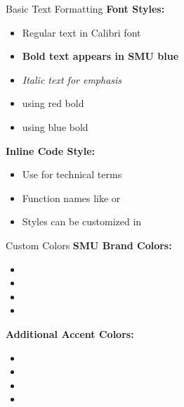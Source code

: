 \documentclass[10pt,aspectratio=1610]{beamer}
\begin{document}
\begin{frame}{Basic Text Formatting}
    \textbf{Font Styles:}
    \begin{itemize}
        \item Regular text in Calibri font
        \item \textbf{Bold text appears in SMU blue}
        \item \textit{Italic text for emphasis}
        \item {} using red bold
        \item {} using blue bold
    \end{itemize}
    
    \vspace{1em}
    
    \textbf{Inline Code Style:}
    \begin{itemize}
        \item Use  for technical terms
        \item Function names like  or 
        \item Styles can be customized in 
    \end{itemize}
\end{frame}

\begin{frame}{Custom Colors}
    \textbf{SMU Brand Colors:}
    \begin{itemize}
        \item {}
        \item {}
        \item {}
        \item {}
    \end{itemize}
    
    \vspace{1em}
    
    \textbf{Additional Accent Colors:}
    \begin{itemize}
        \item {}
        \item {}
        \item {}
        \item {}
    \end{itemize}
\end{frame}
\end{document}
